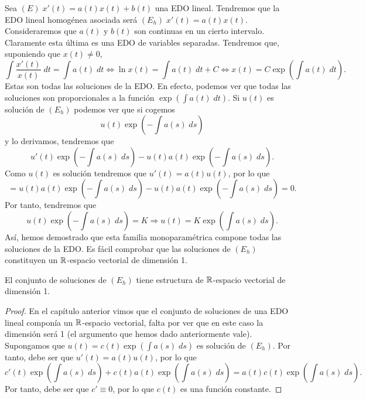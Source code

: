 Sea $\displaystyle \left(E\right) \; x'\left(t\right) = a\left(t\right)x\left(t\right) + b\left(t\right) $ una EDO lineal. Tendremos que la EDO lineal homogénea asociada será $\displaystyle \left(E_{h}\right) \; x'\left(t\right) = a\left(t\right)x\left(t\right) $. Consideraremos que $\displaystyle a\left(t\right) $ y $\displaystyle b\left(t\right) $ son continuas en un cierto intervalo. Claramente esta última es una EDO de variables separadas. Tendremos que, suponiendo que $\displaystyle x\left(t\right)\neq 0 $,
\[ \int \frac{x'\left(t\right)}{x\left(t\right)} \; dt = \int a\left(t\right) \; dt \iff \ln x\left(t\right) = \int a\left(t\right) \; dt + C \iff x\left(t\right) = C\exp\left(\int a\left(t\right) \; dt\right) .\]
Estas son todas las soluciones de la EDO. En efecto, podemos ver que todas las soluciones son proporcionales a la función $\displaystyle \exp\left(\int a\left(t\right) \; dt\right) $. Si $\displaystyle u\left(t\right) $ es solución de $\displaystyle \left(E_{h}\right) $ podemos ver que si cogemos
\[u\left(t\right)\exp\left(-\int a\left(s\right) \; d s\right) \]
y lo derivamos, tendremos que 
\[u'\left(t\right)\exp\left(-\int a\left(s\right) \; d s\right) - u\left(t\right)a\left(t\right)\exp\left(-\int a\left(s\right) \; d s\right) .\]
Como $\displaystyle u\left(t\right) $ es solución tendremos que $\displaystyle u'\left(t\right)= a\left(t\right)u\left(t\right) $, por lo que 
\[ = u\left(t\right)a\left(t\right)\exp\left(-\int a\left(s\right) \; d s\right) - u\left(t\right)a\left(t\right)\exp\left(-\int a\left(s\right) \; d s\right) = 0 .\]
Por tanto, tendremos que 
\[ u\left(t\right)\exp\left(-\int a\left(s\right) \; d s\right)= K \Rightarrow u\left(t\right) = K\exp\left(\int a\left(s\right) \; d s\right) .\]
Así, hemos demostrado que esta familia monoparamétrica compone todas las soluciones de la EDO. Es fácil comprobar que las soluciones de $\displaystyle \left(E_{h}\right) $ constituyen un $\displaystyle \mathbb{R} $-espacio vectorial de dimensión 1.
\begin{prop}
El conjunto de soluciones de $\displaystyle \left(E_{h}\right) $ tiene estructura de $\displaystyle \mathbb{R} $-espacio vectorial de dimensión 1.
\end{prop}
\begin{proof}
	En el capítulo anterior vimos que el conjunto de soluciones de una EDO lineal componía un $\displaystyle \mathbb{R} $-espacio vectorial, falta por ver que en este caso la dimensión será 1 (el argumento que hemos dado anteriormente vale). \\
Supongamos que $\displaystyle u\left(t\right)=c\left(t\right)\exp\left(\int a\left(s\right) \; d s\right) $ es solución de $\displaystyle \left(E_{h}\right) $. Por tanto, debe ser que $\displaystyle u'\left(t\right)=a\left(t\right)u\left(t\right) $, por lo que 
\[c'\left(t\right)\exp\left(\int a\left(s\right) \; d s\right) + c\left(t\right)a\left(t\right)\exp\left(\int a\left(s\right) \; d s\right) = a\left(t\right)c\left(t\right)\exp\left(\int a\left(s\right) \; d s\right) .\]
Por tanto, debe ser que $\displaystyle c'\equiv 0 $, por lo que $\displaystyle c\left(t\right) $ es una función constante. 
\end{proof}
